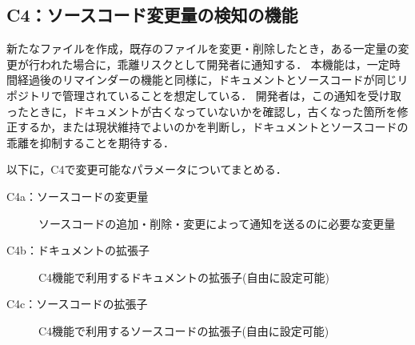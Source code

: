 \subsection{C4：ソースコード変更量の検知の機能}
\label{c4}
新たなファイルを作成，既存のファイルを変更・削除したとき，ある一定量の変更が行われた場合に，乖離リスクとして開発者に通知する．
本機能は，一定時間経過後のリマインダーの機能と同様に，ドキュメントとソースコードが同じリポジトリで管理されていることを想定している．
開発者は，この通知を受け取ったときに，ドキュメントが古くなっていないかを確認し，古くなった箇所を修正するか，または現状維持でよいのかを判断し，ドキュメントとソースコードの乖離を抑制することを期待する．

以下に，C4で変更可能なパラメータについてまとめる．
\begin{description}
    \item[C4a：ソースコードの変更量] ソースコードの追加・削除・変更によって通知を送るのに必要な変更量
    \item[C4b：ドキュメントの拡張子] C4機能で利用するドキュメントの拡張子(自由に設定可能)
    \item[C4c：ソースコードの拡張子] C4機能で利用するソースコードの拡張子(自由に設定可能)
\end{description}